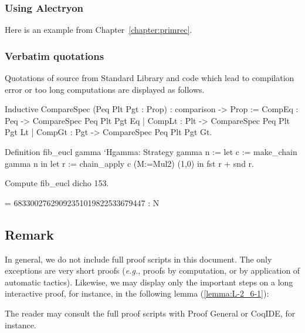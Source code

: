 \documentclass[a4paper]{book}
\begin{document}
\subsubsection{Using Alectryon}


Here is an example from Chapter~\ref{chapter:primrec}.

\vspace{4pt}




\subsubsection{Verbatim quotations}

Quotations of \coq{} source  from Standard Library and code which lead to compilation error or too long computations are displayed as follows.

\begin{Coqsrc}
  Inductive CompareSpec (Peq Plt Pgt : Prop) :
  comparison -> Prop :=
    CompEq : Peq -> CompareSpec Peq Plt Pgt Eq
  | CompLt : Plt -> CompareSpec Peq Plt Pgt Lt
  | CompGt : Pgt -> CompareSpec Peq Plt Pgt Gt.
\end{Coqsrc}

\begin{Coqsrc}
Definition fib_eucl gamma `{Hgamma: Strategy gamma} n :=
  let c := make_chain gamma  n
  in let r := chain_apply c (M:=Mul2) (1,0) in
       fst r + snd r.

Compute fib_eucl dicho 153.
\end{Coqsrc}

\begin{Coqanswer}
    = 68330027629092351019822533679447
     : N
\end{Coqanswer}


 \subsection{Remark}
 
In general, we do not include full proof scripts in this document. The only exceptions are very short proofs (\emph{e.g.}, proofs by computation, or by application of automatic tactics). Likewise, we may display only the important steps on a long interactive proof, for instance, in the following lemma (\vref{lemma:L-2_6-1}):




The reader may consult the full proof scripts with Proof General or CoqIDE, for instance.
\end{document}
